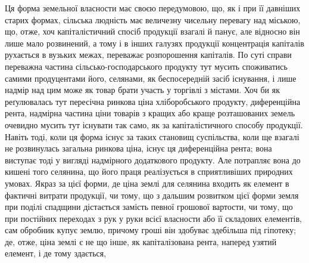 Ця форма земельної власности має своєю передумовою, що, як і при її
давніших старих формах, сільська людність має величезну чисельну перевагу
над міською, що, отже, хоч капіталістичний спосіб продукції взагалі й панує,
але відносно він лише мало розвинений, а тому і в інших галузях продукції
концентрація капіталів рухається в вузьких межах, переважає розпорошення
капіталів. По суті справи переважна частина сільсько-господарського продукту
тут мусить споживатись самими продуцентами його, селянами, як беспосередній
засіб існування, і лише надмір над цим може як товар брати участь у торгівлі
з містами. Хоч би як реґулювалась тут пересічна ринкова ціна хліборобського
продукту, диференційна рента, надмірна частина ціни товарів з кращих або
краще розташованих земель очевидно мусить тут існувати так само, як за
капіталістичного способу продукції. Навіть тоді, коли ця форма існує за таких
становищ суспільства, коли ще взагалі не розвинулась загальна ринкова ціна,
існує ця диференційна рента; вона виступає тоді у вигляді надмірного додаткового
продукту. Але потрапляє вона до кишені того селянина, що його праця
реалізується в сприятливіших природних умовах. Якраз за цієї форми, де ціна
землі для селянина входить як елемент в фактичні витрати продукції, чи тому,
що з дальшим розвитком цієї форми земля при поділі спадщини дістається замість
певної грошової вартости, чи тому, що при постійних переходах з рук
у руки всієї власности або її складових елементів, сам обробник купує землю,
причому гроші він здобуває здебільша під гіпотеку; де, отже, ціна землі є не
що інше, як капіталізована рента, наперед узятий елемент, і де тому здається,
\parbreak{}  %
